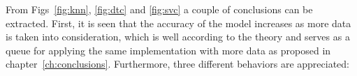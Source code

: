 
From Figs~\ref{fig:knn}, \ref{fig:dtc} and \ref{fig:svc} a couple of conclusions can be extracted. First, it is seen that the accuracy of the model increases as more data is taken into consideration, which is well according to the theory and serves as a queue for applying the same implementation with more data as proposed in chapter~\ref{ch:conclusions}. Furthermore, three different behaviors are appreciated:

